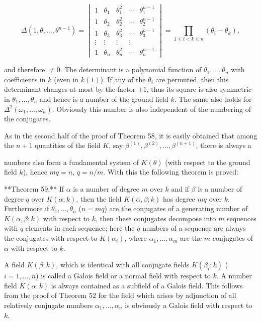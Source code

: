 $$\Delta(1, \theta, \ldots, \theta^{n-1}) = \begin{vmatrix}
1 & \theta_1 & \theta_1^2 & \cdots & \theta_1^{n-1} \\
1 & \theta_2 & \theta_2^2 & \cdots & \theta_2^{n-1} \\
1 & \theta_3 & \theta_3^2 & \cdots & \theta_3^{n-1} \\
\vdots & \vdots & \vdots & \vdots \\
1 & \theta_n & \theta_n^2 & \cdots & \theta_n^{n-1}
\end{vmatrix} = \prod_{1 \leq i < k \leq n} (\theta_i - \theta_k),$$

and therefore $\neq 0$. The determinant is a polynomial function of $\theta_1, \ldots, \theta_n$ with coefficients in $k$ (even in $k(1)$). If any of the $\theta_i$ are permuted, then this determinant changes at most by the factor $\pm 1$, thus its square is also symmetric in $\theta_1, \ldots, \theta_n$ and hence is a number of the ground field $k$. The same also holds for $\Delta^2(\omega_1, \ldots, \omega_n)$. Obviously this number is also independent of the numbering of the conjugates.

As in the second half of the proof of Theorem 58, it is easily obtained that among the $n+1$ quantities of the field $K$, say $\beta^{(1)}, \beta^{(2)}, \ldots, \beta^{(n+1)}$, there is always a

numbers also form a fundamental system of $K(\theta)$ (with respect to the ground field $k$), hence $mq = n$, $q = n/m$. With this the following theorem is proved:

**Theorem 59.** If $\alpha$ is a number of degree $m$ over $k$ and if $\beta$ is a number of degree $q$ over $K(\alpha; k)$, then the field $K(\alpha, \beta; k)$ has degree $mq$ over $k$. Furthermore if $\theta_1, \ldots, \theta_n$ ($n = mq$) are the conjugates of a generating number of $K(\alpha, \beta; k)$ with respect to $k$, then these conjugates decompose into $m$ sequences with $q$ elements in each sequence; here the $q$ numbers of a sequence are always the conjugates with respect to $K(\alpha_i)$, where $\alpha_1, \ldots, \alpha_m$ are the $m$ conjugates of $\alpha$ with respect to $k$.

A field $K(\beta; k)$, which is identical with all conjugate fields $K(\beta_i; k)$ ($i = 1, \ldots, n$) is called a Galois field or a normal field with respect to $k$. A number field $K(\alpha; k)$ is always contained as a subfield of a Galois field. This follows from the proof of Theorem 52 for the field which arises by adjunction of all relatively conjugate numbers $\alpha_1, \ldots, \alpha_n$ is obviously a Galois field with respect to $k$.

